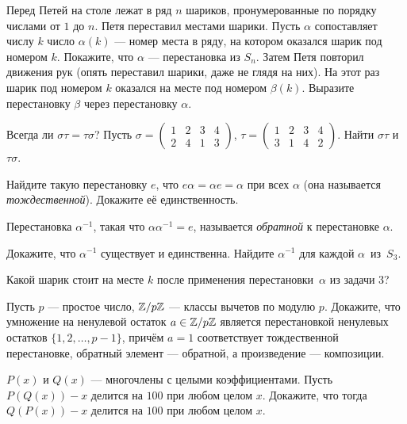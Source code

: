 \documentclass[a4paper,11pt]{article}
\newcommand{\Zm}[1]{\Z/ {#1}\Z}
\begin{document}
Перед Петей на столе лежат в ряд $n$ шариков, пронумерованные по порядку числами от $1$ до $n$. Петя переставил местами шарики. Пусть $\alpha$ сопоставляет числу $k$ число $\alpha(k)$ --- номер места в ряду, на котором оказался шарик под номером $k$.  Покажите, что $\alpha$ --- перестановка из $S_n$.
 Затем Петя повторил движения рук (опять переставил шарики, даже не глядя на них). На этот раз шарик под номером $k$ оказался на месте под номером $\beta(k)$. Выразите перестановку $\beta$ через перестановку $\alpha$.

Всегда ли $\sigma\tau=\tau\sigma$?
Пусть
$\sigma=\displaystyle\begin{pmatrix}1&2&3&4\\2&4&1&3\end{pmatrix}$,
$\tau=\displaystyle\begin{pmatrix}1&2&3&4\\3&1&4&2\end{pmatrix}$.
Найти $\sigma\tau$ и $\tau\sigma$.


Найдите такую перестановку $e$, что $e\alpha=\alpha e=\alpha$ при всех $\alpha$ (она называется {\it тождественной}). Докажите её единственность.


Перестановка $\alpha^{-1}$, такая что $\alpha\alpha^{-1}=e$, называется {\it обратной} к перестановке $\alpha$.

  Докажите, что $\alpha^{-1}$ существует и единственна.
 Найдите $\alpha^{-1}$ для каждой $\alpha$~из~$S_3$.

Какой шарик стоит на месте $k$ после применения перестановки~$\alpha$ из задачи 3?


Пусть $p$ --- простое число, $\Zm{p}$ --- классы вычетов по модулю $p$. Докажите, что
умножение на ненулевой остаток $a\in \Zm{p}$ является перестановкой ненулевых остатков $\{1,2,\ldots,p-1\}$, причём $a=1$ соответствует тождественной перестановке, обратный элемент --- обратной, а произведение --- композиции.

$P(x)$ и $Q(x)$ --- многочлены с целыми коэффициентами.
Пусть $P(Q(x))-x$ делится на $100$
при любом целом $x$. Докажите, что тогда $Q(P(x))-x$ делится на $100$ при любом
целом $x$.
\end{document}
